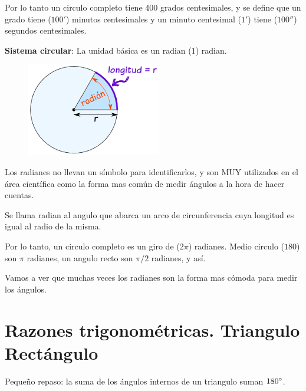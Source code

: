 \documentclass[a4paper,11pt,spanish,sans]{exam}
\begin{document}
Por lo tanto un circulo completo tiene 400 grados centesimales, y se define que un grado tiene ($100'$) minutos centesimales y un minuto centesimal ($1'$) tiene ($100''$) segundos centesimales.

\textbf{Sistema circular}: La unidad básica es un radian ($1$) radian.
\begin{figure}
  \begin{center}
    \includegraphics[width=\linewidth]{radian.png}
  \end{center}
\end{figure}
Los radianes no llevan un símbolo para identificarlos, y son MUY utilizados en el área científica como la forma mas común de medir ángulos a la hora de hacer cuentas.

Se llama radian al angulo que abarca un arco de circunferencia cuya longitud es igual al radio de la misma.


Por lo tanto, un circulo completo es un giro de ($2\pi $) radianes. Medio circulo ($180$) son $\pi$ radianes, un angulo recto son $\pi /2$ radianes, y así.

Vamos a ver que muchas veces los radianes son la forma mas cómoda para medir los ángulos.

\section*{Razones trigonométricas. Triangulo Rectángulo}

Pequeño repaso:
la suma de los ángulos internos de un triangulo suman $180\degree$.\\
\end{document}
